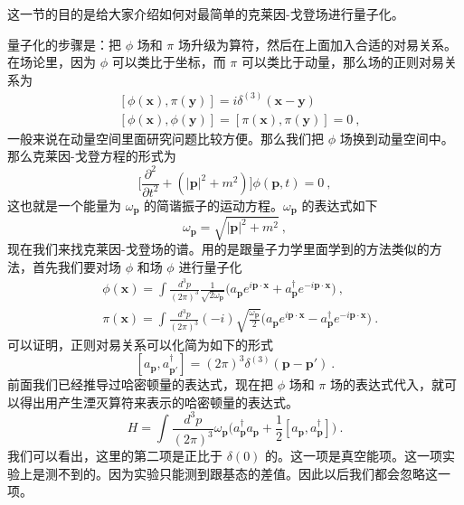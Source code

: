 这一节的目的是给大家介绍如何对最简单的克莱因-戈登场进行量子化。

量子化的步骤是：把 $\phi$ 场和 $\pi$ 场升级为算符，然后在上面加入合适的对易关系。在场论里，因为 $\phi$ 可以类比于坐标，而 $\pi$ 可以类比于动量，那么场的正则对易关系为
\begin{equation}
\begin{aligned}
& [\phi(\mathbf x),\pi(\mathbf y)] = i \delta^{(3)}(\mathbf x- \mathbf y) \\
& [\phi(\mathbf x),\phi(\mathbf y)]  = [\pi(\mathbf x),\pi(\mathbf y)] = 0~,
\end{aligned}
\end{equation}
一般来说在动量空间里面研究问题比较方便。那么我们把 $\phi$ 场换到动量空间中。那么克莱因-戈登方程的形式为
\begin{equation}
\bigg[\frac{\partial^2}{\partial t^2}+(|\mathbf p|^2+m^2)\bigg] \phi(\mathbf p, t) = 0~,
\end{equation}
这也就是一个能量为 $\omega_{\mathbf p}$ 的简谐振子的运动方程。$\omega_{\mathbf p}$ 的表达式如下
\begin{equation}
\omega_{\mathbf p} = \sqrt{|\mathbf p|^2+m^2}~,
\end{equation}
现在我们来找克莱因-戈登场的谱。用的是跟量子力学里面学到的方法类似的方法，首先我们要对场 $\phi$ 和场 $\phi$ 进行量子化
\begin{equation}\label{eq_quanti_3}
\begin{aligned}
& \phi(\mathbf x) = \int \frac{d^3p}{(2\pi)^3} \frac{1}{\sqrt{2\omega_{\mathbf p}}}\bigg( a_{\mathbf p} e^{i \mathbf p \cdot \mathbf x} + a_{\mathbf p}^\dagger e^{-i\mathbf p \cdot \mathbf x} \bigg)~, \\
& \pi(\mathbf x) = \int \frac{d^3p}{(2\pi)^3} (-i) \sqrt{\frac{\omega_{\mathbf p}}{2}} \bigg( a_{\mathbf p} e^{i \mathbf p \cdot \mathbf x} - a^{\dagger}_{\mathbf p} e^{-i \mathbf p \cdot \mathbf x} \bigg)~.
\end{aligned}
\end{equation}
可以证明，正则对易关系可以化简为如下的形式
\begin{equation}\label{eq_quanti_2}
[a_{\mathbf p},a_{\mathbf p'}^\dagger] = (2\pi)^3 \delta^{(3)} (\mathbf p - \mathbf p')~.
\end{equation}
前面我们已经推导过哈密顿量的表达式，现在把 $\phi$ 场和 $\pi$ 场的表达式代入，就可以得出用产生湮灭算符来表示的哈密顿量的表达式。
\begin{equation}\label{eq_quanti_1}
H = \int \frac{d^3p}{(2\pi)^3} \omega_{\mathbf p} \bigg(  a^\dagger_{\mathbf p} a_{\mathbf p} + \frac{1}{2} [a_{\mathbf p},a^\dagger_{\mathbf p}] \bigg)~.
\end{equation}
我们可以看出，这里的第二项是正比于 $\delta(0)$ 的。这一项是真空能项。这一项实验上是测不到的。因为实验只能测到跟基态的差值。因此以后我们都会忽略这一项。

